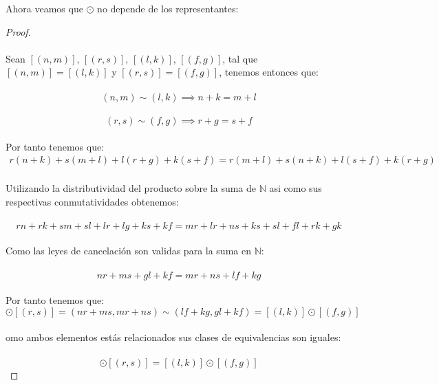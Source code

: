 \documentclass[11pt,letterpaper]{article}
\newcommand{\N}{\mathbb{N}}
\begin{document}
    Ahora veamos que $\odot$ no depende de los representantes:
    \begin{proof}\,\\
    \,\\
    Sean $[(n,m)],\,[(r,s)],\,[(l,k)],\,[(f,g)]$, tal que $[(n,m)]=[(l,k)]$ y $[(r,s)]=[(f,g)]$, tenemos entonces que:\,\\
    \,\\
    \begin{equation*}
        (n,m)\sim(l,k)\implies n+k=m+l 
    \end{equation*}\,\\
    \begin{equation*}
        (r,s)\sim(f,g)\implies r+g=s+f
    \end{equation*}\,\\
    Por tanto tenemos que:\,\\
    \begin{align*}
        r(n+k)+s(m+l)+l(r+g)+k(s+f)=r(m+l)+s(n+k)+l(s+f)+k(r+g)
    \end{align*}\,\\
    Utilizando la distributividad del producto sobre la suma de $\N$ asi como sus respectivas conmutatividades obtenemos:\,\\
    \,\\
    \begin{equation*}
        rn+rk+sm+sl+lr+lg+ks+kf=mr+lr+ns+ks+sl+fl+rk+gk
    \end{equation*}\,\\
    Como las leyes de cancelaci\'on son validas para la suma en $\N$:\,\\
    \,\\
    \begin{equation*}
        nr+ms+gl+kf=mr+ns+lf+kg
    \end{equation*}\,\\
    Por tanto tenemos que:\,\\
    \begin{equation*}
        [(n,m)]\odot[(r,s)]=(nr+ms,mr+ns)\sim(lf+kg,gl+kf)=[(l,k)]\odot[(f,g)]
    \end{equation*}\,\\
    omo ambos elementos est\'as relacionados sus clases de equivalencias son iguales:\,\\
    \,\\
    \begin{equation*}
        [(n,m)]\odot[(r,s)]=[(l,k)]\odot[(f,g)]
    \end{equation*}
    \end{proof}\,\\
\end{document}

